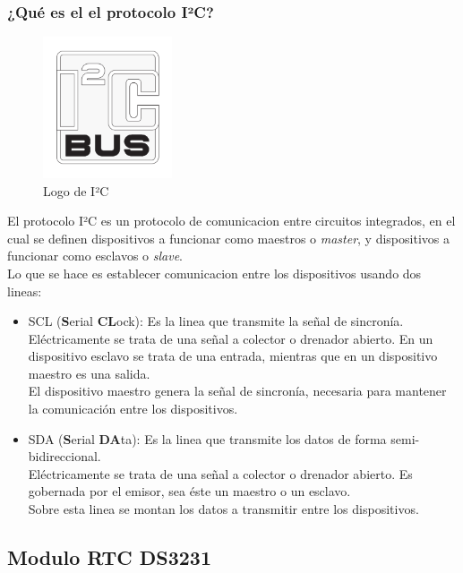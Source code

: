 \documentclass{article}
\begin{document}
		\subsubsection{¿Qué es el el protocolo I²C?}
		\begin{figure}
			\centering
			\includegraphics[width= 1.5in, keepaspectratio]{I2C_logo.png}	
			\caption{Logo de I²C}
		\end{figure}
		El protocolo I²C es un protocolo de comunicacion entre circuitos integrados,
		en el cual se definen dispositivos a funcionar como maestros o \emph{master},
		y dispositivos a funcionar como esclavos o \emph{slave}. \\
		Lo que se hace es establecer comunicacion entre los dispositivos usando dos lineas:
		\begin{itemize}
			\item SCL (\textbf{S}erial \textbf{CL}ock):
				Es la linea que transmite la señal de sincronía.\\
				Eléctricamente se trata de una señal a colector o drenador abierto.
				En un dispositivo esclavo se trata de una entrada, 
				mientras que en un dispositivo maestro es una salida.\\
				El dispositivo maestro genera la señal de sincronía, necesaria para
				mantener la comunicación entre los dispositivos.
			\item SDA (\textbf{S}erial \textbf{DA}ta):
				Es la linea que transmite los datos de forma semi-bidireccional.\\
				Eléctricamente se trata de una señal a colector o drenador abierto.
				Es gobernada por el emisor, sea éste un maestro o un esclavo.\\
				Sobre esta linea se montan los datos a transmitir entre los dispositivos.
		\end{itemize}

	\clearpage		
	\subsection{Modulo RTC DS3231}
\end{document}
